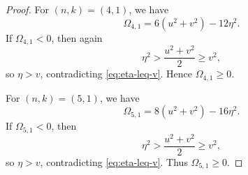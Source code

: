 \documentclass[11pt]{amsart}
\numberwithin{equation}{section}
\theoremstyle{definition}
\theoremstyle{remark}
\begin{document}
\begin{proof}
For \((n,k)=(4,1)\), we have
\begin{equation}\label{eq:n4k1-Omega}
\Omega_{4,1}=6(u^2+v^2)-12\eta^2.
\end{equation}
If \(\Omega_{4,1}<0\), then again
\begin{equation}\label{eq:n4k1-contradiction}
\eta^2>\frac{u^2+v^2}{2}\geq v^2,
\end{equation}
so \(\eta>v\), contradicting \eqref{eq:eta-leq-v}.  Hence
\(\Omega_{4,1}\geq 0\).

For \((n,k)=(5,1)\), we have
\begin{equation}\label{eq:n5k1-Omega}
\Omega_{5,1}=8(u^2+v^2)-16\eta^2.
\end{equation}
If \(\Omega_{5,1}<0\), then
\begin{equation}\label{eq:n5k1-contradiction}
\eta^2>\frac{u^2+v^2}{2}\geq v^2,
\end{equation}
so \(\eta>v\), contradicting \eqref{eq:eta-leq-v}.  Thus
\(\Omega_{5,1}\geq 0\).


\end{proof}
\end{document}
